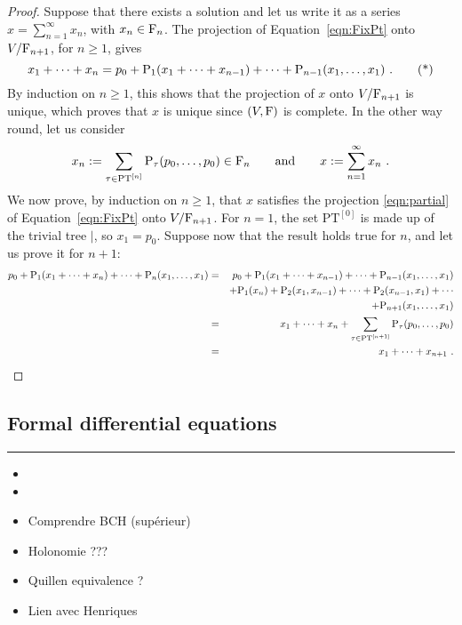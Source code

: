 \documentclass[twoside, 10pt]{amsart}
\begin{document}
\begin{proof}
Suppose that there exists a solution and let us write it as a series  $x=\sum_{n=1}^\infty x_n$, with $x_n\in \mathrm{F}_n$. The projection of Equation~\eqref{eqn:FixPt} onto $V/\mathrm{F}_{n+1}$, for $n\geqslant 1$, gives 
\begin{equation}\label{eqn:partial}
x_1+\cdots+x_{n}=p_0+\mathrm{P}_1(x_1+\cdots+x_{n-1})+\cdots+\mathrm{P}_{n-1}(x_1, \ldots, x_1)\ .\tag{*}
\end{equation}
By induction on $n\geqslant 1$, this shows that the  projection of $x$ onto $V/\mathrm{F}_{n+1}$ is unique, which proves that $x$ is unique since $(V, \mathrm{F})$ is complete. 
In the other way round, let us consider 
\[
x_n:=\sum_{\tau \in \mathrm{PT}^{[n]}} \mathrm{P}_\tau(p_0, \ldots, p_0) \in \mathrm{F}_n \qquad \text{and}
\qquad x:=\sum_{n=1}^\infty x_n\ .
\]
We now prove, by induction on $n\geqslant 1$, that $x$ satisfies the projection \eqref{eqn:partial} of  Equation~\eqref{eqn:FixPt} onto $V/\mathrm{F}_{n+1}$. 
For $n=1$, the set $\mathrm{PT}^{[0]}$ is made up of the trivial tree $|$, so $x_1=p_0$. Suppose now that the result holds true for $n$, and let us prove it for $n+1$:
\begin{eqnarray*}
p_0+\mathrm{P}_1(x_1+\cdots+x_{n})+\cdots+\mathrm{P}_{n}(x_1, \ldots, x_1)&=&p_0+\mathrm{P}_1(x_1+\cdots+x_{n-1})+\cdots+\mathrm{P}_{n-1}(x_1, \ldots, x_1)\\
&&+\mathrm{P}_1(x_n)+\mathrm{P}_2(x_1, x_{n-1})+\cdots+\mathrm{P}_2(x_{n-1}, x_1)+\cdots\\
&&+\mathrm{P}_{n+1}(x_1, \ldots, x_1) \\
&=&x_1+\cdots+x_{n} + \sum_{\tau \in \mathrm{PT}^{[n+1]}} \mathrm{P}_\tau(p_0, \ldots, p_0)\\
&=&x_1+\cdots+x_{n+1}\ .
\end{eqnarray*}
\end{proof}

\subsection{Formal differential equations}




\medskip
\hrule\medskip
{}
\begin{itemize}


\item {}
\item {}
\item Comprendre BCH (sup\'erieur) 
\item Holonomie ???
\item Quillen equivalence ? 
\item Lien avec Henriques 
\end{itemize}
\end{document}
